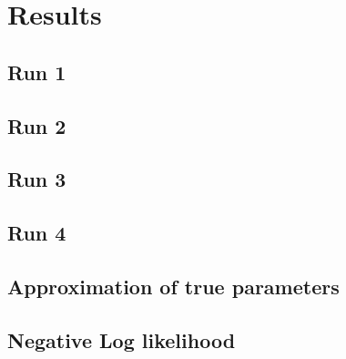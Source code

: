 \section{Results}



\subsection{Run 1}



\subsection{Run 2}


\subsection{Run 3}


\subsection{Run 4}



\subsection{Approximation of true parameters}


\subsection{Negative Log likelihood}




